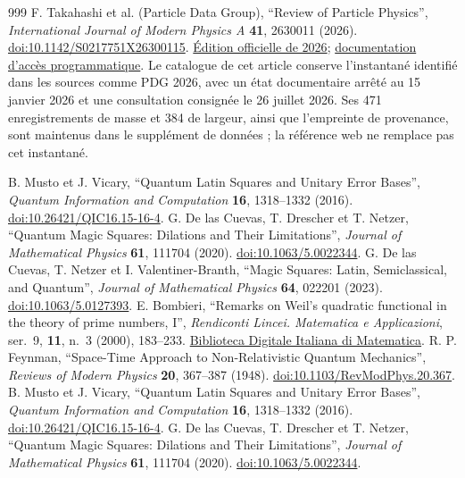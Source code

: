 \begin{thebibliography}{999}
F. Takahashi et al. (Particle Data Group),
``Review of Particle Physics'',
\emph{International Journal of Modern Physics A} \textbf{41}, 2630011 (2026).
\href{https://doi.org/10.1142/S0217751X26300115}{doi:10.1142/S0217751X26300115}.
\href{https://pdg.lbl.gov/2026/}{Édition officielle de 2026};
\href{https://pdg.lbl.gov/2026/api/index.html}{documentation d’accès programmatique}.
Le catalogue de cet article conserve l’instantané identifié dans les sources
comme PDG 2026, avec un état documentaire arrêté au 15 janvier 2026 et une consultation consignée
le 26 juillet 2026. Ses 471 enregistrements de masse et 384 de largeur, ainsi que
l’empreinte de provenance, sont maintenus dans le supplément de données ; la référence
web ne remplace pas cet instantané.

 B. Musto et J. Vicary, ``Quantum Latin Squares and Unitary Error Bases'', \emph{Quantum Information and Computation} \textbf{16}, 1318--1332 (2016). \href{https://doi.org/10.26421/QIC16.15-16-4}{doi:10.26421/QIC16.15-16-4}.
 G. De las Cuevas, T. Drescher et T. Netzer, ``Quantum Magic Squares: Dilations and Their Limitations'', \emph{Journal of Mathematical Physics} \textbf{61}, 111704 (2020). \href{https://doi.org/10.1063/5.0022344}{doi:10.1063/5.0022344}.
 G. De las Cuevas, T. Netzer et I. Valentiner-Branth, ``Magic Squares: Latin, Semiclassical, and Quantum'', \emph{Journal of Mathematical Physics} \textbf{64}, 022201 (2023). \href{https://doi.org/10.1063/5.0127393}{doi:10.1063/5.0127393}.
 E. Bombieri,
``Remarks on Weil's quadratic functional in the theory of prime numbers, I'',
\emph{Rendiconti Lincei. Matematica e Applicazioni},
ser.~9, \textbf{11}, n.~3 (2000), 183--233.
\href{https://www.bdim.eu/item?id=RLIN_2000_9_11_3_183_0}{Biblioteca Digitale Italiana di Matematica}.
 R. P. Feynman, ``Space-Time Approach to Non-Relativistic Quantum Mechanics'', \emph{Reviews of Modern Physics} \textbf{20}, 367--387 (1948). \href{https://doi.org/10.1103/RevModPhys.20.367}{doi:10.1103/RevModPhys.20.367}.
 B. Musto et J. Vicary, ``Quantum Latin Squares and Unitary Error Bases'', \emph{Quantum Information and Computation} \textbf{16}, 1318--1332 (2016). \href{https://doi.org/10.26421/QIC16.15-16-4}{doi:10.26421/QIC16.15-16-4}.
 G. De las Cuevas, T. Drescher et T. Netzer, ``Quantum Magic Squares: Dilations and Their Limitations'', \emph{Journal of Mathematical Physics} \textbf{61}, 111704 (2020). \href{https://doi.org/10.1063/5.0022344}{doi:10.1063/5.0022344}.

\end{thebibliography}
